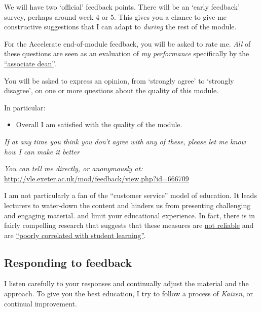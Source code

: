 \documentclass[]{article}
\providecommand{\tightlist}{%
  \setlength{\itemsep}{0pt}\setlength{\parskip}{0pt}}
\begin{document}
We will have two `official' feedback points. There will be an `early
feedback' survey, perhaps around week 4 or 5. This gives you a chance to
give me constructive suggestions that I can adapt to \emph{during} the
rest of the module.

\bigskip

For the Accelerate end-of-module feedback, you will be asked to rate me.
\emph{All} of these questions are seen as an evaluation of \emph{my
performance} specifically by the
\href{https://twitter.com/ass_deans?ref_src=twsrc\%5Egoogle\%7Ctwcamp\%5Eserp\%7Ctwgr\%5Eauthor}{``associate
dean''}.

You will be asked to express an opinion, from `strongly agree' to
`strongly disagree', on one or more questions about the quality of this
module.

In particular:

\begin{itemize}
\tightlist
\item
  Overall I am satisfied with the quality of the module.
\end{itemize}

\emph{If at any time you think you don't agree with any of these, please
let me know how I can make it better}

\emph{You can tell me directly, or anonymously at:}
\url{http://vle.exeter.ac.uk/mod/feedback/view.php?id=666709}

I am not particularly a fan of the ``customer service'' model of
education. It leads lecturers to water-down the content and hinders us
from presenting challenging and engaging material. and limit your
educational experience. In fact, there is in fairly compelling research
that suggests that these measures are
\href{https://www.tandfonline.com/doi/full/10.1080/2331186X.2017.1304016}{not
reliable} and are
\href{https://thepsychologist.bps.org.uk/volume-32/april-2019/excellence-or-ease-exploring-student-evaluations-teaching}{``poorly
correlated with student learning''}.

\hypertarget{responding-to-feedback}{%
\subsection{Responding to feedback}\label{responding-to-feedback}}

I listen carefully to your responses and continually adjust the material
and the approach. To give you the best education, I try to follow a
process of \emph{Kaizen}, or continual improvement.
\end{document}
